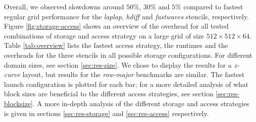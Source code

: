 Overall, we observed slowdowns around $50\%$, $30\%$ and $5\%$ compared to fastest regular grid performance for the \emph{laplap}, \emph{hdiff} and \emph{fastwaves} stencils, respectively. Figure \ref{fig:storage-access} shows an overview of the overhead for all tested combinations of storage and access strategy on a large grid of size $512\times 512\times 64$. Table \ref{tab:overview} lists the fastest access strategy, the runtimes and the overheads for the three stencils in all possible storage configurations. For different domain sizes, see section \ref{sec:res-size}. We chose to display the results for a \emph{z-curve} layout, but results for the \emph{row-major} benchmarks are similar. The fastest launch configuration is plotted for each bar; for a more detailed analysis of what block sizes are beneficial to the different access strategies, see section \ref{sec:res-blocksize}. A more in-depth analysis of the different storage and access strategies is given in sections \ref{sec:res-storage} and \ref{sec:res-access} respectively.

